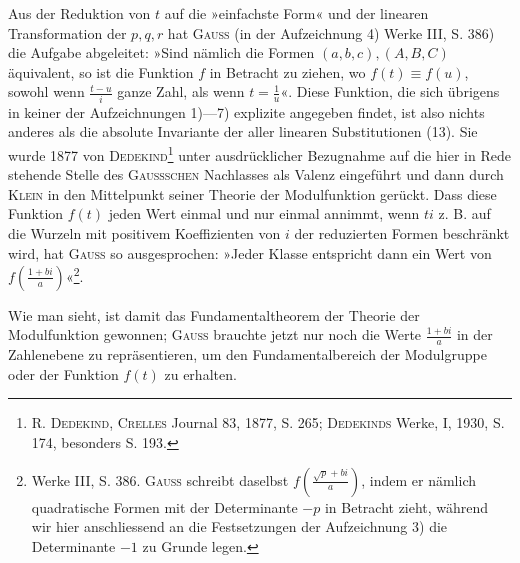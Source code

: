 Aus der Reduktion von \(t\) auf die »einfachste Form« und der linearen
Transformation der  \(p,q,r\) hat \textsc{Gauss}
(in der Aufzeichnung 4) Werke III, S. 386) die Aufgabe abgeleitet: »Sind
nämlich die Formen \((a,b,c),(A,B,C)\) äquivalent, so ist die Funktion \(f\)
in Betracht zu ziehen, wo \(f(t)\equiv f(u)\), sowohl wenn \(\frac{t-u}i\) ganze Zahl, als
wenn \(t=\frac1u\)«. Diese Funktion, die sich übrigens in keiner der Aufzeichnungen
1)—7) explizite angegeben findet, ist also nichts anderes als die
absolute Invariante der  aller linearen Substitutionen (13).
Sie wurde 1877 von \textsc{Dedekind}\footnote{R. \textsc{Dedekind}, \textsc{Crelles} Journal 83, 1877, S. 265; \textsc{Dedekinds} Werke, I, 1930, S. 174, besonders S. 193.} unter ausdrücklicher Bezugnahme auf die
hier in Rede stehende Stelle des \textsc{Gaussschen} Nachlasses als Valenz eingeführt
und dann durch \textsc{Klein} in den Mittelpunkt seiner Theorie der Modulfunktion
gerückt. Dass diese Funktion \(f(t)\) jeden Wert einmal und nur einmal
annimmt, wenn \(ti\) z. B. auf die Wurzeln mit positivem Koeffizienten von \(i\)
der reduzierten Formen beschränkt wird, hat \textsc{Gauss} so ausgesprochen: »Jeder
Klasse entspricht dann ein  Wert von \(f\left(\frac{1+bi}a\right)\)«\footnote{Werke III, S. 386. \textsc{Gauss} schreibt daselbst \(f\left(\frac{\sqrt p+bi}a\right)\), indem er nämlich quadratische Formen mit der Determinante \(-p\) in Betracht zieht, während wir hier anschliessend an die Festsetzungen der Aufzeichnung 3) die Determinante \(-1\) zu Grunde legen.}.

Wie man sieht, ist damit das Fundamentaltheorem der Theorie der Modulfunktion
gewonnen; \textsc{Gauss} brauchte jetzt nur noch die Werte \(\frac{1+bi}a\) in der
Zahlenebene zu repräsentieren, um den Fundamentalbereich der Modulgruppe
oder der Funktion \(f(t)\) zu erhalten.

